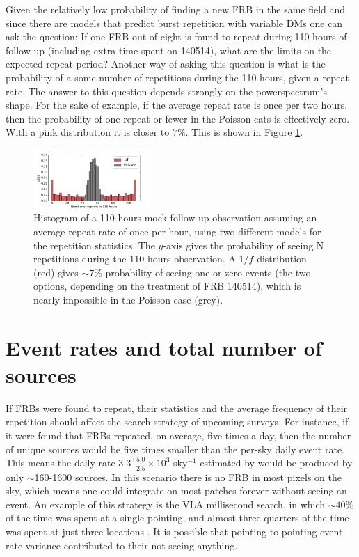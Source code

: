 \documentclass[useAMS,usenatbib]{mn2e}
\begin{document}
Given the relatively low probability of finding 
a new FRB in the same field and since there are models that predict
burst repetition with variable DMs \citep{2015arXiv150505535C, 2015arXiv150701002M}
one can ask the question: If one FRB out of eight is found to
repeat during 110 hours of follow-up (including extra time spent on 140514), 
what are the limits on the expected
repeat period? Another way of asking this question is what is the probability of 
a some number of repetitions during the 110 hours, given a repeat rate. The answer to 
this question depends strongly on the powerspectrum's shape. For the sake of example, if the average 
repeat rate is once per two hours, then the probability of one repeat or fewer in the Poisson
cats is effectively zero. With a pink distribution it is closer to $7\%$. This is 
shown in Figure \ref{FIG-hist}. 

\begin{figure}
  \centering
   \includegraphics[trim={0in, 0in, 0in, 0in}, width=0.4\textwidth, height=0.23\textwidth]{110_hours_followup.png}
   \caption{Histogram of a 110-hours mock follow-up observation assuming an average repeat rate of 
   once per hour, using two different models 
   for the repetition statistics. The $y$-axis gives the probability of seeing 
   N repetitions during the 110-hours observation.
   A 1$/f$ distribution (red) gives $\sim7\%$ probability of seeing one or zero events 
   (the two options, depending on the treatment of FRB 140514), 
   which is nearly impossible in the Poisson case (grey).}
   \label{FIG-hist}
\end{figure}


\section{Event rates and total number of sources}
\label{rate}

If FRBs were found to repeat, their statistics and the
average frequency of their repetition 
should affect the search strategy of upcoming surveys. 
For instance, if it were found that FRBs repeated,
on average, five times a day, then the number of unique 
sources would be five times smaller than the per-sky 
daily event rate. This means the daily rate 
$3.3^{+5.0}_{-2.5}\times10^3$ sky$^{-1}$ estimated by 
\cite{2015arXiv150500834R} would be produced by
only $\sim$160-1600 sources. In this scenario 
there is no FRB in most pixels on the sky, which means
one could integrate on most patches forever without 
seeing an event. An example of this strategy is the VLA millisecond search, 
in which $\sim40\%$ of the time was spent at a single pointing, and
almost three quarters of the time was spent at just three locations \citep{2015ApJ...807...16L}.
It is possible that pointing-to-pointing event rate variance contributed 
to their not seeing anything.
\end{document}
